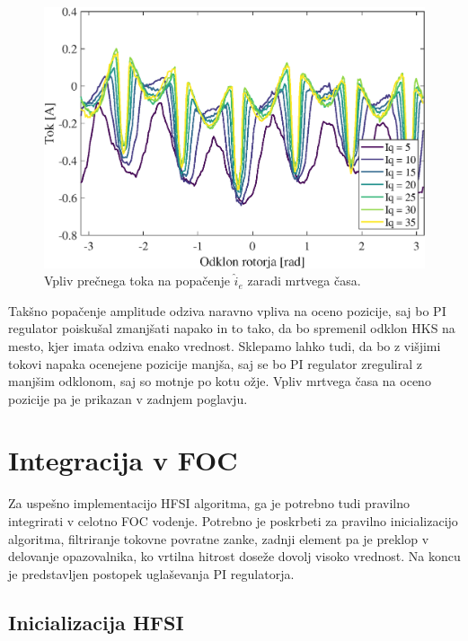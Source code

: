 \documentclass[a4paper,twoside,openright,12pt,slovene]{book}
\begin{document}
\begin{figure}[!htbp]
    \centering
    \includegraphics[width=0.75\columnwidth]{Slike/tokovniOdzivIs_HKSslediRKS_IdiffAmp_DT.eps}
    \caption{\label{tokovniOdzivIs_HKSslediRKS_IdiffAmp_DT} Vpliv prečnega toka na popačenje $\hat{i}_{e}$ zaradi mrtvega časa. }
\end{figure}


Takšno popačenje amplitude odziva naravno vpliva na oceno pozicije, saj bo PI regulator poiskušal zmanjšati napako in to tako, da bo spremenil odklon HKS na mesto, kjer imata odziva enako vrednost.
Sklepamo lahko tudi, da bo z višjimi tokovi napaka ocenejene pozicije manjša, saj se bo PI regulator zreguliral z manjšim odklonom, saj so motnje po kotu ožje. Vpliv mrtvega časa na oceno pozicije pa
je prikazan v zadnjem poglavju.

\chapter{Integracija v FOC} \label{integracija}

Za uspešno implementacijo HFSI algoritma, ga je potrebno tudi pravilno integrirati v celotno FOC vodenje. Potrebno je poskrbeti za pravilno inicializacijo algoritma, filtriranje tokovne povratne
zanke, zadnji element pa je preklop v delovanje opazovalnika, ko vrtilna hitrost doseže dovolj visoko vrednost. Na koncu je predstavljen postopek uglaševanja PI regulatorja.

\section{Inicializacija HFSI}
\end{document}
